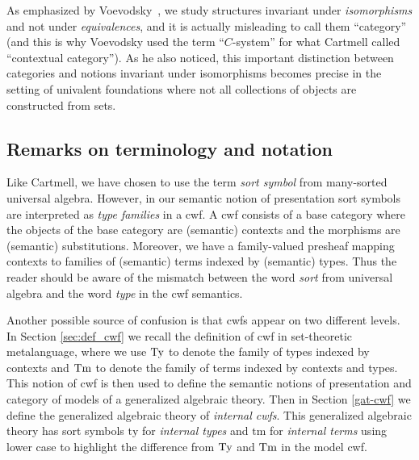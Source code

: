 \documentclass{lmcs}
\newcommand{\FYI}[1]{{\color{red}#1}}
\newcommand{\ty}{\mathrm{ty}}
\newcommand{\tm}{\mathrm{tm}}
\begin{document}
As emphasized by Voevodsky~\cite{voevodsky:initiality}, we study structures invariant
under {\em isomorphisms} and not under {\em equivalences}, and it is actually misleading
to call them ``category'' (and this is why Voevodsky used the term ``$C$-system''
for what Cartmell called ``contextual category'').
As he also noticed, this
important distinction between categories and notions invariant under isomorphisms becomes
precise in the setting of univalent foundations where not all collections of objects
are constructed from sets.


\subsection*{Remarks on terminology and notation}
Like Cartmell, we have chosen to use the term {\em sort symbol} from many-sorted universal algebra. However, in our semantic notion of \FYI{presentation} sort symbols are interpreted as {\em type families} in a cwf. A cwf consists of a base category where the objects of the base category are (semantic) contexts and the morphisms are (semantic) substitutions. Moreover, we have a family-valued presheaf mapping contexts to families of (semantic) terms indexed by (semantic) types. Thus the reader should be aware of the mismatch between the word {\em sort} from universal algebra and the word {\em type} in the cwf semantics.

Another possible source of confusion is that cwfs appear on two different levels. In Section \ref{sec:def_cwf} we recall the definition of cwf in set-theoretic metalanguage, where we use $\mathrm{Ty}$ to denote the family of types indexed by contexts and $\mathrm{Tm}$ to denote the family of terms indexed by contexts and types. This notion of cwf is then used to define the semantic notions of \FYI{presentation} and category of models of a generalized algebraic theory. Then in Section \ref{gat-cwf} we define the generalized algebraic theory of {\em internal cwfs}. This generalized algebraic theory has sort symbols $\ty$ for {\em internal types} and $\tm$ for {\em internal terms} using lower case to highlight the difference from $\mathrm{Ty}$ and $\mathrm{Tm}$ in the model cwf.
\end{document}
